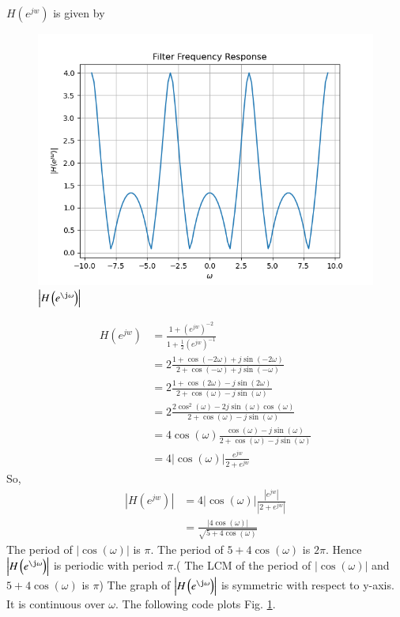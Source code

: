 \documentclass[journal,12pt,twocolumn]{IEEEtran}
\renewcommand\thesection{\arabic{section}}
\begin{document}
\begin{enumerate}[label=\thesection.\arabic*]
$H(e^{jw})$ is given by
\begin{figure}[!ht]
	\centering
	\includegraphics[width=\columnwidth]{./figs/4.5}
	\caption{$\abs{H\brak{e^{\j\omega}}}$}
	\label{fig:4.5}
\end{figure}
\begin{align}
	H(e^{jw})&=\frac{1+(e^{jw})^{-2}}{1+\frac{1}{2}(e^{jw})^{-1}}\\
	&=2\frac{1+\cos(-2\omega)+j\sin(-2\omega)}{2+\cos(-\omega)+j\sin(-\omega)}\\
	&=2\frac{1+\cos(2\omega)-j\sin(2\omega)}{2+\cos(\omega)-j\sin(\omega)}\\
	&=2\frac{2\cos^2(\omega)-2j\sin(\omega)\cos(\omega)}{2+\cos(\omega)-j\sin(\omega)}\\
	&=4\cos(\omega)\frac{\cos(\omega)-j\sin(\omega)}{2+\cos(\omega)-j\sin(\omega)}\\
	&=4|\cos(\omega)| \frac{e^{jw}}{2+e^{jw}}
\end{align}
So,
\begin{align}
	|H(e^{jw})|&=4 |\cos(\omega)| \frac{|e^{jw}|}{|2+e^{jw}|}\\
	&=\frac{|4\cos(\omega)|}{\sqrt{5+4\cos(\omega)}}
\end{align}
The period of $|\cos(\omega)|$ is $\pi$. The period of $5+4\cos(\omega)$ is $2\pi$. Hence $\abs{H\brak{e^{\j\omega}}}$ is periodic with period $\pi$.( The LCM of the period of $|\cos(\omega)|$ and $5+4\cos(\omega)$ is $\pi$)
The graph of $\abs{H\brak{e^{\j\omega}}}$ is symmetric with respect to y-axis. It is continuous over $\omega$. The following code plots Fig. \ref{fig:4.5}.


\end{enumerate}
\end{document}
